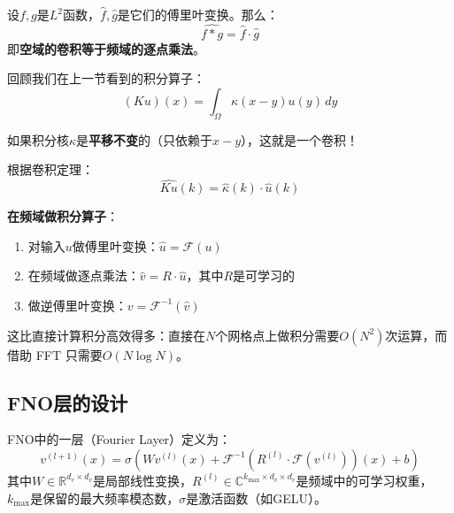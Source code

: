 \begin{theorem}[卷积定理]
设$f, g$是$L^2$函数，$\hat{f}, \hat{g}$是它们的傅里叶变换。那么：
\begin{equation}
    \widehat{f * g} = \hat{f} \cdot \hat{g}
\end{equation}
即\textbf{空域的卷积等于频域的逐点乘法}。
\end{theorem}

回顾我们在上一节看到的积分算子：
\begin{equation}
    (Ku)(x) = \int_\Omega \kappa(x-y) u(y) \, dy
\end{equation}

如果积分核$\kappa$是\textbf{平移不变}的（只依赖于$x-y$），这就是一个卷积！

根据卷积定理：
\begin{equation}
    \widehat{Ku}(k) = \hat{\kappa}(k) \cdot \hat{u}(k)
\end{equation}

\begin{insightbox}
\textbf{在频域做积分算子}：
\begin{enumerate}
    \item 对输入$u$做傅里叶变换：$\hat{u} = \mathcal{F}(u)$
    \item 在频域做逐点乘法：$\hat{v} = R \cdot \hat{u}$，其中$R$是可学习的
    \item 做逆傅里叶变换：$v = \mathcal{F}^{-1}(\hat{v})$
\end{enumerate}

这比直接计算积分高效得多：直接在$N$个网格点上做积分需要$O(N^2)$次运算，而借助 FFT 只需要$O(N \log N)$。
\end{insightbox}

\subsection{FNO层的设计}

\begin{definition}[傅里叶层]
FNO中的一层（Fourier Layer）定义为：
\begin{equation}
    v^{(l+1)}(x) = \sigma\left( Wv^{(l)}(x) + \mathcal{F}^{-1}\left(R^{(l)} \cdot \mathcal{F}(v^{(l)})\right)(x) + b \right)
\end{equation}
其中$W \in \mathbb{R}^{d_v \times d_v}$是局部线性变换，$R^{(l)} \in \mathbb{C}^{k_{\max} \times d_v \times d_v}$是频域中的可学习权重，$k_{\max}$是保留的最大频率模态数，$\sigma$是激活函数（如GELU）。
\end{definition}

